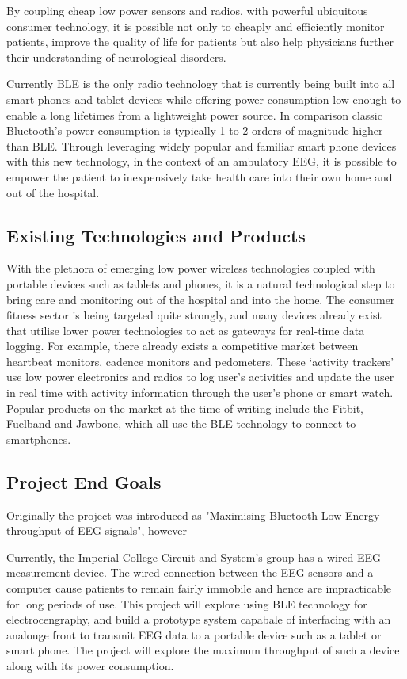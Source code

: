 \documentclass[]{article}
\begin{document}
By coupling cheap low power sensors and radios, with powerful ubiquitous consumer technology, it is possible not only to cheaply and efficiently monitor patients, improve the quality of life for patients but also help physicians further their understanding of neurological disorders.

Currently \ac{BLE} is the only radio technology that is currently being built into all smart phones and tablet devices while offering power consumption low enough to enable a long lifetimes from a lightweight power source. In comparison classic Bluetooth’s power consumption is typically 1 to 2 orders of magnitude higher than BLE. Through leveraging widely popular and familiar smart phone devices with this new technology, in the context of an ambulatory EEG, it is possible to empower the patient to inexpensively take health care into their own home and out of the hospital.


\subsection{Existing Technologies and Products}


With the plethora of emerging low power wireless technologies coupled with portable devices such as tablets and phones, it is a natural technological step to bring care and monitoring out of the hospital and into the home. The consumer fitness sector is being targeted quite strongly, and many devices already exist that utilise lower power technologies to act as gateways for real-time data logging. For example, there already exists a competitive market between heartbeat monitors, cadence monitors and pedometers. These ‘activity trackers’ use low power electronics and radios to log user’s activities and update the user in real time with activity information through the user’s phone or smart watch. Popular products on the market at the time of writing include the Fitbit, Fuelband and Jawbone, which all use the \ac{BLE} technology to connect to smartphones.

\subsection{Project End Goals}
Originally the project was introduced as "Maximising Bluetooth Low Energy throughput of \ac{EEG} signals", however 

Currently, the Imperial College Circuit and System's group has a wired \ac{EEG} measurement device. The wired connection between the EEG sensors and a computer cause patients to remain fairly immobile and hence are impracticable for long periods of use. This project will explore using \ac{BLE} technology for electrocengraphy, and build a prototype system capabale of interfacing with an analouge front to transmit \ac{EEG} data to a portable device such as a tablet or smart phone.  The project will explore the maximum throughput of such a device along with its power consumption.
\end{document}
